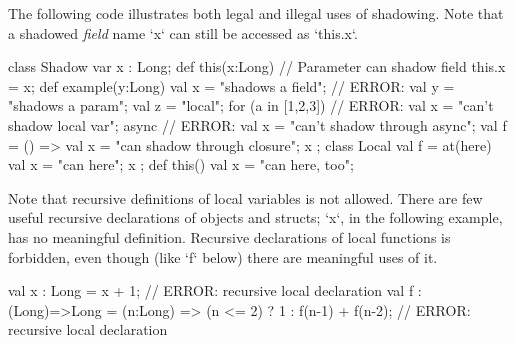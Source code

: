 \begin{ex}
The following code illustrates both legal and illegal uses of shadowing.
Note that a shadowed {\em field} name \xcd`x` can still be accessed 
as \xcd`this.x`. 

\begin{xten}
class Shadow{
  var x : Long; 
  def this(x:Long) { 
     // Parameter can shadow field
     this.x = x; 
  }
  def example(y:Long) {
     val x = "shadows a field";
     // ERROR: val y = "shadows a param";
     val z = "local";
     for (a in [1,2,3]) {
        // ERROR: val x = "can't shadow local var";
     }
     async {
        // ERROR: val x = "can't shadow through async";
     }        
     val f = () => { 
       val x = "can shadow through closure";
       x
     };
     class Local {
        val f = at(here) { val x = "can here"; x };
        def this() { val x = "can here, too"; }
     }
  }
}
\end{xten}
%



\end{ex}

\begin{ex}
Note that recursive definitions of local variables is not allowed.  There are
few useful recursive declarations of objects and structs; \xcd`x`, in the
following example, has no meaningful definition.  Recursive declarations of
local functions is forbidden, even though (like \xcd`f` below) there are
meaningful uses of it.  
\begin{xten}
val x : Long = x + 1; // ERROR: recursive local declaration
val f : (Long)=>Long 
      = (n:Long) => (n <= 2) ? 1 : f(n-1) + f(n-2);
      // ERROR: recursive local declaration
\end{xten}

\end{ex}



